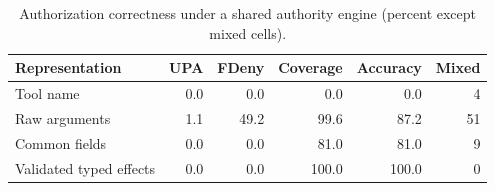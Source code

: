 \begin{table}[t]
\centering
\small
\caption{Authorization correctness under a shared authority engine (percent except mixed cells).}
\label{tab:protocol-separated-authorization}
\begin{tabular}{lrrrrr}
\toprule
Representation & UPA & FDeny & Coverage & Accuracy & Mixed \\
\midrule
Tool name & 0.0 & 0.0 & 0.0 & 0.0 & 4 \\
Raw arguments & 1.1 & 49.2 & 99.6 & 87.2 & 51 \\
Common fields & 0.0 & 0.0 & 81.0 & 81.0 & 9 \\
Validated typed effects & 0.0 & 0.0 & 100.0 & 100.0 & 0 \\
\bottomrule
\end{tabular}
\end{table}
